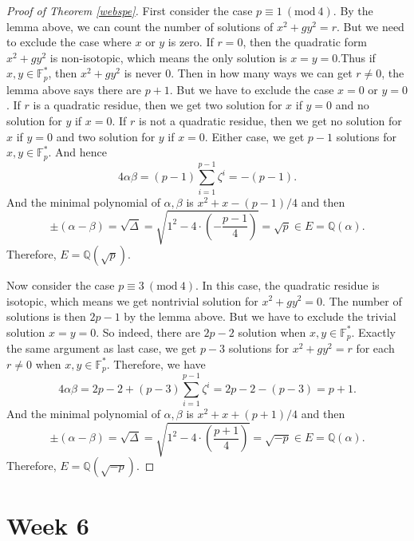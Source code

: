 \documentclass[12pt]{report}
\theoremstyle{definition}
\newcommand{\Mod}[1]{\ (\mathrm{mod}\ #1)}
\newcommand{\ff}{\mathbb{F}}
\newcommand{\qq}{\mathbb{Q}}
\begin{document}
\begin{proof}[Proof of Theorem \ref{webspe}]
	First consider the case $p\equiv 1\Mod{4}$. By the lemma above, we can count the number of solutions of $x^2+gy^2=r$. But we need to exclude the case where $x$ or $y$ is zero. If $r=0$, then the quadratic form $x^2+gy^2$ is non-isotopic, which means the only solution is $x=y=0$.Thus if $x,y\in \ff_p^*$, then $x^2+gy^2$ is never 0. Then in how many ways we can get $r\not=0$, the lemma above says there are $p+1$. But we have to exclude the case $x=0$ or $y=0$. If $r$ is a quadratic residue, then we get two solution for $x$ if $y=0$ and no solution for $y$ if $x=0$. If $r$ is not a quadratic residue, then we get no solution for $x$ if $y=0$ and two solution for $y$ if $x=0$. Either case, we get $p-1$ solutions for $x,y\in \ff_p^*$. And hence \[4\alpha\beta= (p-1)\sum_{i=1}^{p-1} \zeta^i=-(p-1).\]
	And the minimal polynomial of $\alpha,\beta$ is $x^2+x-(p-1)/4$ and then \[\pm(\alpha-\beta)=\sqrt{\Delta}=\sqrt{1^2-4 \cdot(-\frac{p-1}{4})}= \sqrt{p}\in E=\qq(\alpha).\] Therefore, $E=\qq(\sqrt{p})$.


	Now consider the case $p\equiv 3\Mod{4}$. In this case, the quadratic residue is isotopic, which means we get nontrivial solution for $x^2+gy^2=0$. The number of solutions is then $2p-1$ by the lemma above. But we have to exclude the trivial solution $x=y=0$. So indeed, there are $2p-2$ solution when $x,y\in \ff_p^*$. Exactly the same argument as last case, we get $p-3$ solutions for $x^2+gy^2=r$ for each $r\not=0$ when $x,y\in \ff_p^*$. Therefore, we have
	\[4\alpha\beta= 2p-2+(p-3)\sum_{i=1}^{p-1} \zeta^i = 2p-2-(p-3)=p+1. \]
	And the minimal polynomial of $\alpha,\beta$ is $x^2+x+(p+1)/4$ and then \[\pm(\alpha-\beta)=\sqrt{\Delta}=\sqrt{1^2-4 \cdot(\frac{p+1}{4})} =\sqrt{-p}\in E=\qq(\alpha).\] Therefore, $E=\qq(\sqrt{-p})$.
\end{proof}

\chapter*{Week 6}
\setcounter{chapter}{6}

\end{document}
